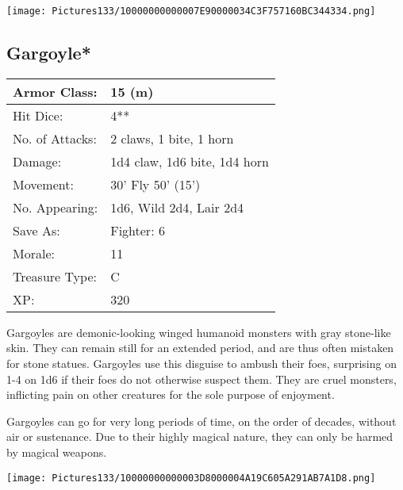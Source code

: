 \documentclass[a4paper,twoside,openany,10pt]{book}
\begin{document}
\begin{center}
	\texttt{[image: Pictures133/10000000000007E90000034C3F757160BC344334.png]}
\end{center}

\begin{multicols}{2}
	

\subsection*{Gargoyle*}\label{gargoyle}

\begin{tabularx}{0.48\textwidth}{@{}lX@{}}
Armor Class: & 15 (m) \\\hline
Hit Dice: & 4** \\\hline
No. of Attacks: & 2 claws, 1 bite, 1 horn \\\hline
Damage: & 1d4 claw, 1d6 bite, 1d4 horn \\\hline
Movement: & 30' Fly 50'
(15') \\\hline
No. Appearing: & 1d6, Wild 2d4, Lair 2d4 \\\hline
Save As: & Fighter: 6 \\\hline
Morale: & 11 \\\hline
Treasure Type: & C \\\hline
XP: & 320 \\\hline
\end{tabularx}\medskip



Gargoyles are demonic-looking winged humanoid monsters with gray stone-like skin. They can remain still for an extended period, and are thus often mistaken for stone statues. Gargoyles use this disguise to ambush their foes, surprising on 1-4 on 1d6 if their foes do not otherwise suspect them. They are cruel monsters, inflicting pain on other creatures for the sole purpose of enjoyment.

Gargoyles can go for very long periods of time, on the order of decades, without air or sustenance. Due to their highly magical nature, they can only be harmed by magical weapons.

\end{multicols}

\vfill

\begin{center}
	\texttt{[image: Pictures133/10000000000003D8000004A19C605A291AB7A1D8.png]}
\end{center}
\end{document}

